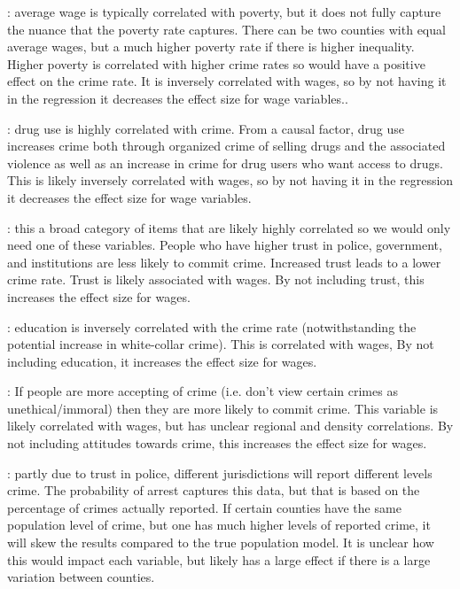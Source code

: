 \begin{description}[font=$\bullet$~\normalfont\scshape\small\color{red!50!black}]
	\item [Poverty rate] {\fontsize{10}{10} \selectfont : average wage is typically correlated with poverty, but it does not fully capture the nuance that the poverty rate captures. There can be two counties with equal average wages, but a much higher poverty rate if there is higher inequality. Higher poverty is correlated with higher crime rates so would have a positive effect on the crime rate. It is inversely correlated with wages, so by not having it in the regression it decreases the effect size for wage variables..}
	\item [Drug use] {\fontsize{10}{10} \selectfont : drug use is highly correlated with crime. From a causal factor, drug use increases crime both through organized crime of selling drugs and the associated violence as well as an increase in crime for drug users who want access to drugs. This is likely inversely correlated with wages, so by not having it in the regression it decreases the effect size for wage variables.}
	\item [Trust in police/institutions] {\fontsize{10}{10} \selectfont : this a broad category of items that are likely highly correlated so we would only need one of these variables. People who have higher trust in police, government, and institutions are less likely to commit crime. Increased trust leads to a lower crime rate. Trust is likely associated with wages. By not including trust, this increases the effect size for wages.}
	\item [Education levels] {\fontsize{10}{10} \selectfont : education is inversely correlated with the crime rate (notwithstanding the potential increase in white-collar crime). This is correlated with wages, By not including education, it increases the effect size for wages.}
	\item [Citizen’s attitude towards crime] {\fontsize{10}{10} \selectfont : If people are more accepting of crime (i.e. don’t view certain crimes as unethical/immoral) then they are more likely to commit crime. This variable is likely correlated with wages, but has unclear regional and density correlations. By not including attitudes towards crime, this increases the effect size for wages.}
	\item [Crime rate reported] {\fontsize{10}{10} \selectfont : partly due to trust in police, different jurisdictions will report different levels crime. The probability of arrest captures this data, but that is based on the percentage of crimes actually reported. If certain counties have the same population level of crime, but one has much higher levels of reported crime, it will skew the results compared to the true population model. It is unclear how this would impact each variable, but likely has a large effect if there is a large variation between counties.}
\end{description}

